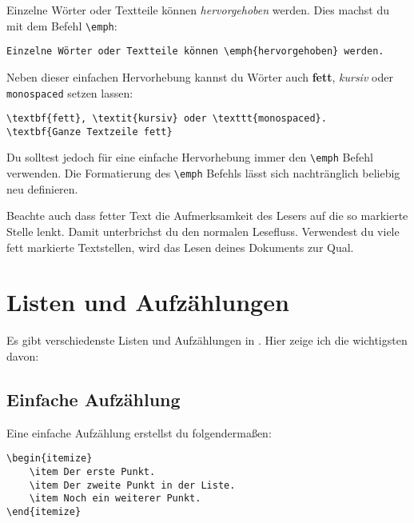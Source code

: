 Einzelne Wörter oder Textteile können \emph{hervorgehoben} werden. Dies machst du mit dem Befehl \texttt{\textbackslash emph}:
\begin{lstlisting}
Einzelne Wörter oder Textteile können \emph{hervorgehoben} werden.
\end{lstlisting}

Neben dieser einfachen Her\-vor\-he\-bung kannst du Wörter auch \textbf{fett}, \textit{kursiv} oder\\ \texttt{monospaced} setzen lassen:
\begin{lstlisting}
\textbf{fett}, \textit{kursiv} oder \texttt{monospaced}.
\textbf{Ganze Textzeile fett}
\end{lstlisting}

Du solltest jedoch für eine einfache Hervorhebung immer den \texttt{\textbackslash emph} Befehl verwenden. Die Formatierung des \texttt{\textbackslash emph} Befehls lässt sich nachtränglich beliebig neu definieren.

Beachte auch dass fetter Text die Aufmerksamkeit des Lesers auf die so markierte Stelle lenkt. Damit unterbrichst du den normalen Lesefluss. Verwendest du viele fett markierte Textstellen, wird das Lesen deines Dokuments zur Qual.

\section{Listen und Aufzählungen}

Es gibt verschiedenste Listen und Aufzählungen in \DMLLaTeX. Hier zeige ich die wichtigsten davon:

\subsection{Einfache Aufzählung}

Eine einfache Aufzählung erstellst du folgendermaßen:
\begin{lstlisting}
\begin{itemize}
	\item Der erste Punkt.
	\item Der zweite Punkt in der Liste.
	\item Noch ein weiterer Punkt.
\end{itemize}
\end{lstlisting}


